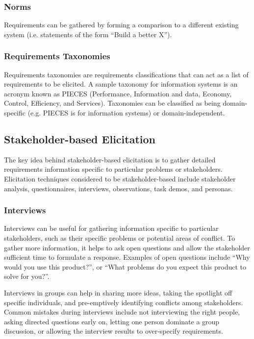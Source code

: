 \documentclass[12pt,titlepage]{article}
\begin{document}
      \subsubsection{Norms}
        Requirements can be gathered by forming a comparison to a different existing system (i.e. statements of the form ``Build a better X'').

      \subsubsection{Requirements Taxonomies}
        Requirements taxonomies are requirements classifications that can act as a list of requirements to be elicited. A sample taxonomy for information
        systems is an acronym known as PIECES (Performance, Information and data, Economy, Control, Efficiency, and Services). Taxonomies can be classified
        as being domain-specific (e.g. PIECES is for information systems) or domain-independent.

    \subsection{Stakeholder-based Elicitation}
      The key idea behind stakeholder-based elicitation is to gather detailed requirements information specific to particular problems or stakeholders.
      Elicitation techniques considered to be stakeholder-based include stakeholder analysis, questionnaires, interviews, observations, task demos, and personas.

      \subsubsection{Interviews}
        Interviews can be useful for gathering information specific to particular stakeholders, such as their specific problems or potential areas of conflict.
        To gather more information, it helps to ask open questions and allow the stakeholder sufficient time to formulate a response. Examples of open questions
        include ``Why would you use this product?'', or ``What problems do you expect this product to solve for you?''.

        Interviews in groups can help in sharing more ideas, taking the spotlight off specific individuals, and pre-emptively identifying conflicts among stakeholders.
        Common mistakes during interviews include not interviewing the right people, asking directed questions early on, letting one person dominate a group discussion,
        or allowing the interview results to over-specify requirements.
\end{document}
